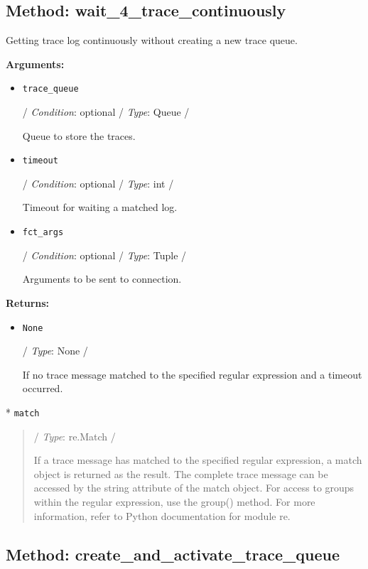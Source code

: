 \hypertarget{qconnectbase-connection-base-method-wait_4_trace_continuously-13}{%
\subsection{Method:
wait\_4\_trace\_continuously}\label{qconnectbase-connection-base-method-wait_4_trace_continuously-13}}

Getting trace log continuously without creating a new trace queue.

\textbf{Arguments:}

\begin{itemize}
\item
  \texttt{trace\_queue}

  / \emph{Condition}: optional / \emph{Type}: Queue /

  Queue to store the traces.
\item
  \texttt{timeout}

  / \emph{Condition}: optional / \emph{Type}: int /

  Timeout for waiting a matched log.
\item
  \texttt{fct\_args}

  / \emph{Condition}: optional / \emph{Type}: Tuple /

  Arguments to be sent to connection.
\end{itemize}

\textbf{Returns:}

\begin{itemize}
\item
  \texttt{None}

  / \emph{Type}: None /

  If no trace message matched to the specified regular expression and a
  timeout occurred.
\end{itemize}

* \texttt{match}

\begin{quote}
/ \emph{Type}: re.Match /

If a trace message has matched to the specified regular expression, a
match object is returned as the result. The complete trace message can
be accessed by the \textquotesingle string\textquotesingle{} attribute
of the match object. For access to groups within the regular expression,
use the group() method. For more information, refer to Python
documentation for module \textquotesingle re\textquotesingle.
\end{quote}

\hypertarget{qconnectbase-connection-base-method-create_and_activate_trace_queue-14}{%
\subsection{Method:
create\_and\_activate\_trace\_queue}\label{qconnectbase-connection-base-method-create_and_activate_trace_queue-14}}

